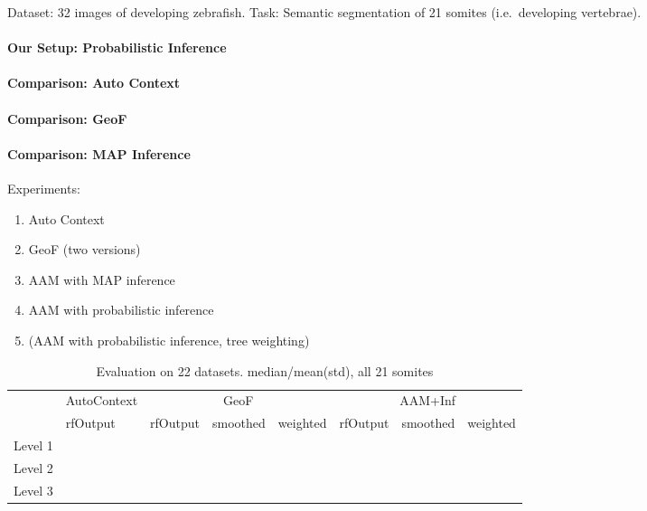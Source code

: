 \documentclass[10pt,twocolumn,letterpaper]{article}
\begin{document}
Dataset: 32 images of developing zebrafish. Task: Semantic segmentation of 21 somites (i.e.\ developing vertebrae).

\paragraph{Our Setup: Probabilistic Inference}

\paragraph{Comparison: Auto Context}

\paragraph{Comparison: GeoF}

\paragraph{Comparison: MAP Inference}

Experiments:
\begin{enumerate}
\item Auto Context
\item GeoF (two versions)
\item AAM with MAP inference 
\item AAM with probabilistic inference 
\item (AAM with probabilistic inference, tree weighting)
\end{enumerate}

\begin{table*}[t]
\begin{center}
\begin{tabular}{l||l|lll|lll}
					& AutoContext & \multicolumn{3}{|c|}{GeoF} & \multicolumn{3}{|c}{AAM+Inf} \\
					& rfOutput & rfOutput & smoothed & weighted & rfOutput & smoothed &weighted \\
\hline
Level 1 &  &  &  &  &  &  \\
Level 2 &  &  &  &  &  & \\
Level 3 &  &  &  &  &  & \\
\hline
\end{tabular}
\caption{Evaluation on 22 datasets. median/mean(std), all 21 somites}
\label{tab:results}
\end{center}
\end{table*}
\end{document}
